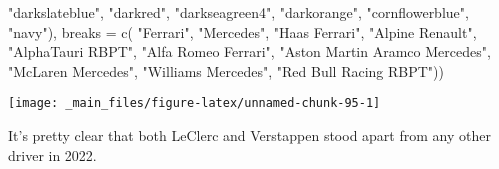 \documentclass[
]{book}
\newenvironment{Shaded}{\begin{snugshade}}{\end{snugshade}}
\newcommand{\AttributeTok}[1]{\textcolor[rgb]{0.77,0.63,0.00}{#1}}
\newcommand{\FunctionTok}[1]{\textcolor[rgb]{0.00,0.00,0.00}{#1}}
\newcommand{\NormalTok}[1]{#1}
\newcommand{\StringTok}[1]{\textcolor[rgb]{0.31,0.60,0.02}{#1}}
\begin{document}
\begin{Shaded}
\begin{Highlighting}[]
                               \StringTok{"darkslateblue"}\NormalTok{, }
                                \StringTok{"darkred"}\NormalTok{,  }
                                \StringTok{"darkseagreen4"}\NormalTok{, }
                                \StringTok{"darkorange"}\NormalTok{, }
                                \StringTok{"cornflowerblue"}\NormalTok{,}
                               \StringTok{"navy"}\NormalTok{),}
                     \AttributeTok{breaks =} \FunctionTok{c}\NormalTok{( }\StringTok{"Ferrari"}\NormalTok{,}
                                 \StringTok{"Mercedes"}\NormalTok{,}
                                 \StringTok{"Haas Ferrari"}\NormalTok{,}
                                 \StringTok{"Alpine Renault"}\NormalTok{,}
                                 \StringTok{"AlphaTauri RBPT"}\NormalTok{,}
                                 \StringTok{"Alfa Romeo Ferrari"}\NormalTok{, }
                                 \StringTok{"Aston Martin Aramco Mercedes"}\NormalTok{,}
                                 \StringTok{"McLaren Mercedes"}\NormalTok{,}
                                 \StringTok{"Williams Mercedes"}\NormalTok{,}
                                 \StringTok{"Red Bull Racing RBPT"}\NormalTok{))}
\end{Highlighting}
\end{Shaded}

\begin{center}\texttt{[image: \_main\_files/figure-latex/unnamed-chunk-95-1]} \end{center}

It's pretty clear that both LeClerc and Verstappen stood apart from any other driver in 2022.
\end{document}
